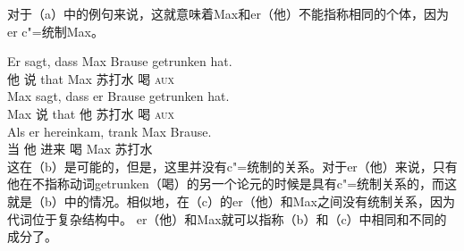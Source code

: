 对于（a）中的例句来说，这就意味着Max和er（他）不能指称相同的个体，因为er c"=统制Max。

\eal
\ex 
\gll Er sagt, dass Max Brause getrunken hat.\\
	 他 说 that Max 苏打水 喝 \textsc{aux}\\
\ex 
\gll Max sagt, dass er Brause getrunken hat.\\
	 Max 说 that 他 苏打水 喝 \textsc{aux}\\
\ex 
\gll Als er hereinkam, trank Max Brause.\\
	 当 他 进来 喝 Max 苏打水\\
\zl
这在（b）是可能的，但是，这里并没有c"=统制的关系。对于er（他）来说，只有他在不指称动词getrunken（喝）的另一个论元的时候是具有c"=统制关系的，而这就是（b）中的情况。相似地，在（c）的er（他）和Max之间没有统制关系，因为代词位于复杂结构中。 er（他）和Max就可以指称（b）和（c）中相同和不同的成分了。

